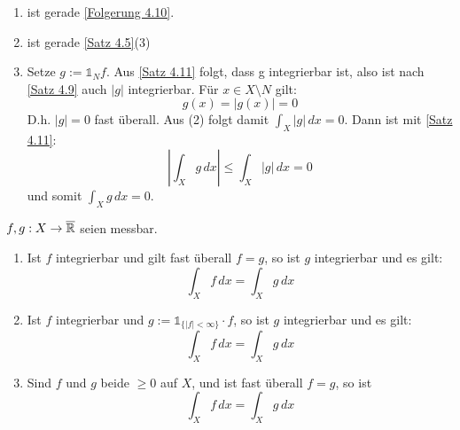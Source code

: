 \documentclass[a4paper,twoside,DIV15,BCOR12mm,chapterprefix=true,headings=onelinechapter]{scrbook}
\begin{document}
\begin{beweis}
\begin{enumerate}
\item ist gerade \ref{Folgerung 4.10}.
\item ist gerade \ref{Satz 4.5}(3)
\item Setze $g:=\mathds{1}_N f$. Aus \ref{Satz 4.11} folgt, dass g integrierbar ist, also ist nach \ref{Satz 4.9} auch $\lvert g \rvert$ integrierbar. Für $x\in X\setminus N$ gilt: 
\[g(x)=\lvert g(x) \rvert =0\]
D.h. $\lvert g \rvert =0$ fast überall. Aus (2) folgt damit $\int_X \lvert g \rvert \,dx = 0$. Dann ist mit \ref{Satz 4.11}: \[\left\lvert\int_X g\,dx \right\rvert \leq \int_X \lvert g \rvert \,dx =0\] 
und somit $\int_X g\,dx=0$.
\end{enumerate}
\end{beweis}

\begin{satz}
\label{Satz 5.3}
$f,g:X\to\overline{\mathbb{R}}$ seien messbar.
\begin{enumerate}
\item Ist $f$ integrierbar und gilt fast überall $f=g$, so ist $g$ integrierbar und es gilt:
\[\int_Xf\,dx=\int_Xg\,dx\]
\item Ist $f$ integrierbar und $g:=\mathds{1}_{\{ \lvert f \rvert <\infty \}}\cdot f$, so ist $g$ integrierbar und es gilt: \[\int_Xf\,dx=\int_Xg\,dx\]
\item Sind $f$ und $g$ beide $\geq0$ auf $X$, und ist fast überall $f=g$, so ist 
\[\int_Xf\,dx=\int_Xg\,dx\]
\end{enumerate}
\end{satz}
\end{document}
